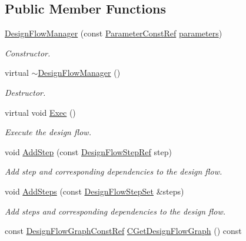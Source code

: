 \subsection*{Public Member Functions}
\begin{DoxyCompactItemize}
\item 
\hyperlink{classDesignFlowManager_a50d4704e76a3132f1cfc24884055faa7}{Design\+Flow\+Manager} (const \hyperlink{Parameter_8hpp_a37841774a6fcb479b597fdf8955eb4ea}{Parameter\+Const\+Ref} \hyperlink{classDesignFlowManager_a445e732d3d9516b40ad5862519a01cfc}{parameters})
\begin{DoxyCompactList}\small\item\em Constructor. \end{DoxyCompactList}\item 
virtual \hyperlink{classDesignFlowManager_a8329c2a542d8f94c55fca404c807eded}{$\sim$\+Design\+Flow\+Manager} ()
\begin{DoxyCompactList}\small\item\em Destructor. \end{DoxyCompactList}\item 
virtual void \hyperlink{classDesignFlowManager_ae33babf44b5caddeafba01e7fa22bcd4}{Exec} ()
\begin{DoxyCompactList}\small\item\em Execute the design flow. \end{DoxyCompactList}\item 
void \hyperlink{classDesignFlowManager_ae694a3d971e944cd6349ef7c3dd0eff7}{Add\+Step} (const \hyperlink{design__flow__step_8hpp_a9dd6b4474ddf52d41a78b1aaa12ae6c8}{Design\+Flow\+Step\+Ref} step)
\begin{DoxyCompactList}\small\item\em Add step and corresponding dependencies to the design flow. \end{DoxyCompactList}\item 
void \hyperlink{classDesignFlowManager_a4ee7e2fb3a5313538b8ec26a49c498bd}{Add\+Steps} (const \hyperlink{classDesignFlowStepSet}{Design\+Flow\+Step\+Set} \&steps)
\begin{DoxyCompactList}\small\item\em Add steps and corresponding dependencies to the design flow. \end{DoxyCompactList}\item 
const \hyperlink{design__flow__graph_8hpp_a0230319e566e6824d3d187b6871598f7}{Design\+Flow\+Graph\+Const\+Ref} \hyperlink{classDesignFlowManager_aaac5aac231b91e51a8d63b611b3acba6}{C\+Get\+Design\+Flow\+Graph} () const

\end{DoxyCompactItemize}
